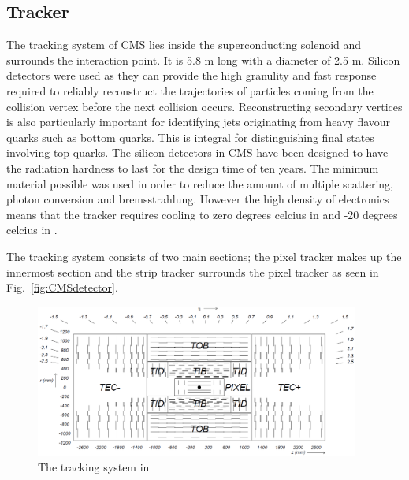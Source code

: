 \subsection{Tracker \label{sec:tracker}}

The tracking system of CMS lies inside the superconducting solenoid and surrounds the interaction point. It is 5.8 m long with a diameter of 2.5 m.
Silicon detectors were used as they can provide the high granulity and fast response required to reliably reconstruct the trajectories of particles coming from the collision vertex before the next collision occurs.
Reconstructing secondary vertices is also particularly important for identifying jets originating from heavy flavour quarks such as bottom quarks. This is integral for distinguishing final states involving top quarks. The silicon detectors in CMS have been designed to have the radiation hardness to last for the design time of ten years. The minimum material possible was used in order to reduce the amount of multiple scattering, photon conversion and bremsstrahlung. However the high density of electronics means that the tracker requires cooling to zero degrees celcius in \runone and -20 degrees celcius in \runtwo. %

The tracking system consists of two main sections; the pixel tracker makes up the innermost section and the strip tracker surrounds the pixel tracker as seen in Fig.~\ref{fig:CMSdetector}. 

\begin{figure}[ht!]
\centering
    \includegraphics[width=0.95\textwidth]{images/TrackerWhole.png}
    \caption{The tracking system in \runone~\cite{1748-0221-3-08-S08004}}
    \label{fig:TrackerWhole}
\end{figure}

